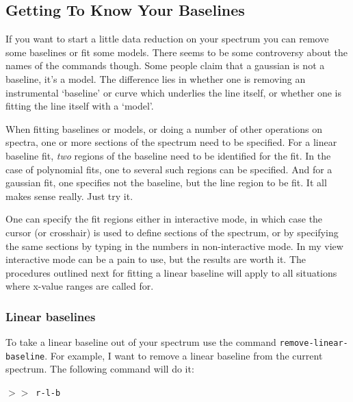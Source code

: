 \documentclass[11pt,twoside]{starlink}
\providecommand{\SP}{{$>\!>$}}
\begin{document}
\subsection{Getting To Know Your Baselines}
\label{sec:specx_5.3}
If you want to start a little data reduction on your spectrum you can
remove some baselines or fit some models.  There seems to be some
controversy about the names of the commands though.  Some people claim
that a gaussian is not a baseline, it's a model. The difference lies
in whether one is removing an instrumental `baseline' or curve which
underlies the line itself, or whether one is fitting the line itself
with a `model'.

When fitting baselines or models, or doing a number of other
operations on spectra, one or more sections of the spectrum need to be
specified. For a linear baseline fit, \emph{two} regions of the baseline need
to be identified for the fit. In the case of polynomial fits, one to
several such regions can be specified. And for a gaussian fit, one
specifies not the baseline, but the line region to be fit. It all
makes sense really. Just try it.

One can specify the fit regions either in interactive mode, in which
case the cursor (or crosshair) is used to define sections of the
spectrum, or by specifying the same sections by typing in the numbers
in non-interactive mode.  In my view interactive mode can be a pain to
use, but the results are worth it. The procedures outlined next for
fitting a linear baseline will apply to all situations where x-value
ranges are called for.

\subsubsection{Linear baselines}
\label{sec:linear-baselines}
To take a linear baseline out of your spectrum use the command \texttt{remove-linear-baseline}.  For example, I want to remove a linear
baseline from the current spectrum.  The following command will do
it:

\SP\ \verb|r-l-b|
\end{document}

